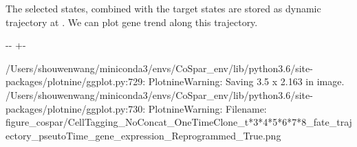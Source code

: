 \documentclass[letterpaper,10pt,english]{sphinxmanual}
\newlength\nbsphinxcodecellspacing
\begin{document}
The selected states, combined with the target states are stored as dynamic trajectory at . We can plot gene trend along this trajectory.

{
\begin{sphinxVerbatim}[commandchars=\\\{\}]
\llap{\color{nbsphinxin}[32]:\,\hspace{\fboxrule}\hspace{\fboxsep}}\PYG{p}{[}\PYG{p}{]}
 
        

\end{sphinxVerbatim}
}

{

\kern-\sphinxverbatimsmallskipamount\kern-\baselineskip
\kern+\FrameHeightAdjust\kern-\fboxrule
\vspace{\nbsphinxcodecellspacing}

\begin{sphinxVerbatim}[commandchars=\\\{\}]
/Users/shouwenwang/miniconda3/envs/CoSpar\_env/lib/python3.6/site-packages/plotnine/ggplot.py:729: PlotnineWarning: Saving 3.5 x 2.163 in image.
/Users/shouwenwang/miniconda3/envs/CoSpar\_env/lib/python3.6/site-packages/plotnine/ggplot.py:730: PlotnineWarning: Filename: figure\_cospar/CellTagging\_NoConcat\_OneTimeClone\_t*3*4*5*6*7*8\_fate\_trajectory\_pseutoTime\_gene\_expression\_Reprogrammed\_True.png
\end{sphinxVerbatim}
}
\end{document}

